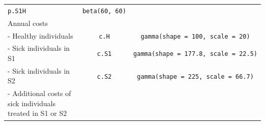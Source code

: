 \documentclass[]{article}
\begin{document}
\begin{longtable}[]{@{}lcc@{}}
\begin{minipage}[t]{0.18\columnwidth}
\texttt{p.S1H}\strut
\end{minipage} & \begin{minipage}[t]{0.20\columnwidth}\centering\strut
\texttt{beta(60,\ 60)}\strut
\end{minipage}\tabularnewline
\begin{minipage}[t]{0.43\columnwidth}\raggedright\strut
Annual costs\strut
\end{minipage} & \begin{minipage}[t]{0.18\columnwidth}\centering\strut
\strut
\end{minipage} & \begin{minipage}[t]{0.20\columnwidth}\centering\strut
\strut
\end{minipage}\tabularnewline
\begin{minipage}[t]{0.43\columnwidth}\raggedright\strut
- Healthy individuals\strut
\end{minipage} & \begin{minipage}[t]{0.18\columnwidth}\centering\strut
\texttt{c.H}\strut
\end{minipage} & \begin{minipage}[t]{0.20\columnwidth}\centering\strut
\texttt{gamma(shape\ =\ 100,\ scale\ =\ 20)}\strut
\end{minipage}\tabularnewline
\begin{minipage}[t]{0.43\columnwidth}\raggedright\strut
- Sick individuals in S1\strut
\end{minipage} & \begin{minipage}[t]{0.18\columnwidth}\centering\strut
\texttt{c.S1}\strut
\end{minipage} & \begin{minipage}[t]{0.20\columnwidth}\centering\strut
\texttt{gamma(shape\ =\ 177.8,\ scale\ =\ 22.5)}\strut
\end{minipage}\tabularnewline
\begin{minipage}[t]{0.43\columnwidth}\raggedright\strut
- Sick individuals in S2\strut
\end{minipage} & \begin{minipage}[t]{0.18\columnwidth}\centering\strut
\texttt{c.S2}\strut
\end{minipage} & \begin{minipage}[t]{0.20\columnwidth}\centering\strut
\texttt{gamma(shape\ =\ 225,\ scale\ =\ 66.7)}\strut
\end{minipage}\tabularnewline
\begin{minipage}[t]{0.43\columnwidth}\raggedright\strut
- Additional costs of sick individuals treated in S1 or S2\strut

\end{minipage}
\end{longtable}
\end{document}
